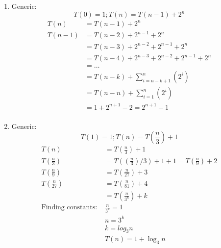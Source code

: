 \documentclass[11pt]{article}
\begin{document}
\begin{enumerate}
\begin{enumerate}
            \item Generic:
            $$T(0) = 1; T(n) = T(n - 1) + 2^n$$
            \begin{equation}
                \begin{split}
                    T(n)   & = T(n - 1) + 2^n \\
                    T(n-1) & = T(n - 2) + 2^{n-1} + 2^n \\
                           & = T(n - 3) + 2^{n-2} + 2^{n-1} + 2^n \\
                           & = T(n - 4) + 2^{n-3} + 2^{n-2} + 2^{n-1} + 2^n\\
                           & = \ldots \\
                           & = T(n - k) + \sum_{i=n-k+1}^n(2^i) \\
                           & = T(n - n) + \sum_{i=1}^n(2^i) \\
                           & = 1 + 2^{n+1} - 2 = 2^{n+1} - 1 \\
                \end{split}
            \end{equation}
        
            \item Generic:
            $$T(1) = 1; T(n) = T(\frac{n}{3}) + 1$$
            \begin{equation}
                \begin{split}
                    T(n) & = T(\frac{n}{3}) + 1 \\
                    T(\frac{n}{3}) & = T((\frac{n}{3}) / 3) + 1 + 1 = T(\frac{n}{9}) + 2 \\
                    T(\frac{n}{9}) & = T(\frac{n}{27}) + 3 \\
                    T(\frac{n}{27}) & = T(\frac{n}{81}) + 4 \\
                    & = T(\frac{n}{3^k}) + k \\
                    \text{Finding constants: } & \frac{n}{3^k} = 1 \\
                    & n = 3^k \\
                    & k = log_3 n \\
                    & T(n) = 1 + \log_3 n \\
                \end{split}
            \end{equation}
            
        \end{enumerate}
    
    \end{enumerate}
\end{document}
